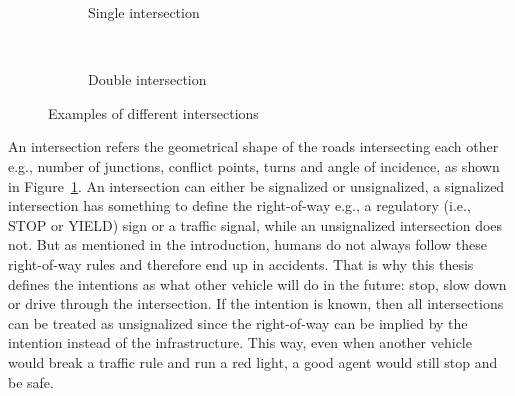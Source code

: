\begin{figure}[h]
	\centering
	\begin{subfigure}[t]{0.48\columnwidth}
		\centering
		\caption{Single intersection}
\end{subfigure}%
	~ 
	\begin{subfigure}[t]{0.48\columnwidth}
		\centering
		\caption{Double intersection}
	\end{subfigure}

	\caption{Examples of different intersections}
	\label{fig:example_intersections}

\end{figure}
An intersection refers the geometrical shape of the roads intersecting each other e.g., number of junctions, conflict points, turns and angle of incidence, as shown in Figure~\ref{fig:example_intersections}. 
An intersection can either be signalized or unsignalized, a signalized intersection has something to define the right-of-way e.g., a regulatory (i.e., STOP or YIELD) sign or a traffic signal, while an unsignalized intersection does not. But as mentioned in the introduction, humans do not always follow these right-of-way rules and therefore end up in accidents. That is why this thesis defines the intentions as what other vehicle will do in the future: stop, slow down or drive through the intersection. If the intention is known, then all intersections can be treated as unsignalized since the right-of-way can be implied by the intention instead of the infrastructure. This way, even when another vehicle would break a traffic rule and run a red light, a good agent would still stop and be safe. 
